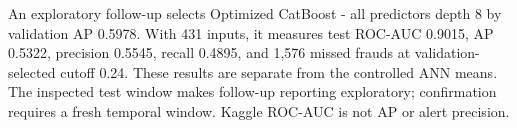An exploratory follow-up selects Optimized CatBoost - all predictors depth 8 by validation AP 0.5978. With 431 inputs, it measures test ROC-AUC 0.9015, AP 0.5322, precision 0.5545, recall 0.4895, and 1,576 missed frauds at validation-selected cutoff 0.24. These results are separate from the controlled ANN means. The inspected test window makes follow-up reporting exploratory; confirmation requires a fresh temporal window. Kaggle ROC-AUC is not AP or alert precision.

